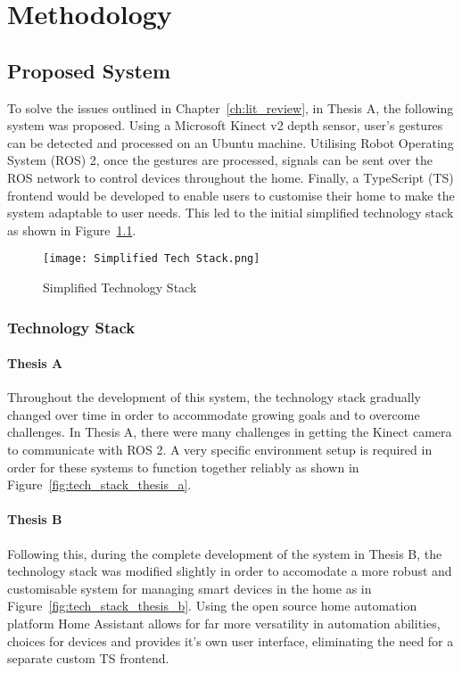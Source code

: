 \chapter{Methodology}\label{ch:methodology}

\section{Proposed System}

To solve the issues outlined in Chapter~\ref*{ch:lit_review}, in Thesis A, the following system was proposed.
Using a Microsoft Kinect v2 depth sensor, user's gestures can be detected and processed on an Ubuntu machine.
Utilising Robot Operating System (ROS) 2, once the gestures are processed, signals can be sent over the ROS network to control devices throughout the home.
Finally, a TypeScript (TS) frontend would be developed to enable users to customise their home to make the system adaptable to user needs.
This led to the initial simplified technology stack as shown in Figure~\ref{fig:simple_tech_stack}.

\begin{figure}[!htb]
    \caption{Simplified Technology Stack}
    \centering
    \texttt{[image: Simplified Tech Stack.png]}
    \label{fig:simple_tech_stack}
\end{figure}

\subsection{Technology Stack}
\subsubsection{Thesis A}
Throughout the development of this system, the technology stack gradually changed over time in order to accommodate growing goals and to overcome challenges.
In Thesis A, there were many challenges in getting the Kinect camera to communicate with ROS 2.
A very specific environment setup is required in order for these systems to function together reliably as shown in Figure~\ref{fig:tech_stack_thesis_a}.

\subsubsection{Thesis B}
Following this, during the complete development of the system in Thesis B, the technology stack was modified slightly in order to accomodate a more robust and customisable system for managing smart devices in the home as in Figure~\ref{fig:tech_stack_thesis_b}.
Using the open source home automation platform Home Assistant allows for far more versatility in automation abilities, choices for devices and provides it's own user interface, eliminating the need for a separate custom TS frontend.

